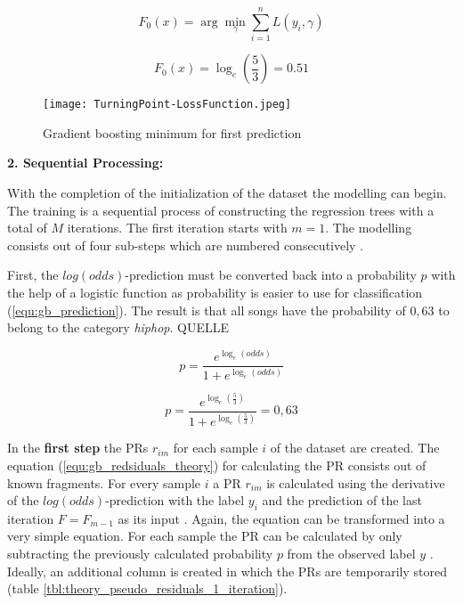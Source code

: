 \begin{equation}
    F_{0}(x) = \arg \min_{\gamma } \sum_{i= 1}^{n} L(y_{i}, \gamma)
    \label{equ:gb_initial_prediciton}
\end{equation}

\begin{equation*}
    F_{0}(x) = \log_{e}(\frac{5}{3}) = 0.51
\end{equation*}

\begin{figure}[H]
    \centering
    \caption[]{Gradient boosting minimum for first prediction}
	\label{fig:gb_turning_point-loss_function}
    \texttt{[image: TurningPoint-LossFunction.jpeg]}
\end{figure}

\textbf{2. Sequential Processing:}

With the completion of the initialization of the dataset the modelling can begin. The training is a sequential 
process of constructing the regression trees with a total of \(M\) iterations. The first iteration 
starts with \(m = 1\). The modelling consists out of four sub-steps which are numbered consecutively \cite[p.1198]{Friedman_2001}.

First, the \(log(odds)\)-prediction must be converted back into a probability \(p\) with the help of a 
logistic function as probability is easier to use for classification (\ref{equ:gb_prediction}). The result is 
that all songs have the probability of \(0,63\) to belong to the category \emph{hiphop}. QUELLE

\begin{equation}
    p = \frac{e^{\log_{e}(odds)}}{1 + e^{\log_{e}(odds)}} 
    \label{equ:gb_prediction}
\end{equation}

\begin{equation*}
    p = \frac{e^{\log_{e}(\frac{5}{3})}}{1 + e^{\log_{e}(\frac{5}{3})}} = 0,63
\end{equation*}

In the \textbf{first step} the \ac{PR}s \(r_{im}\) for each sample \(i\) of the dataset are created. The equation (\ref{equ:gb_redsiduals_theory}) 
for calculating the \ac{PR} consists out of known fragments. For every sample \(i\) a PR \(r_{im}\) 
is calculated using the derivative of the \(log(odds)\)-prediction with the label \(y_{i}\) and the 
prediction of the last iteration \(F = F_{m - 1}\) as its input \cite[p.361]{Hastie_2009}. Again, the equation can be 
transformed into a very simple equation. For each sample the \ac{PR} can be calculated by only 
subtracting the previously calculated probability \(p\) from the observed label \(y\) \cite{parr2022gb_explained_hrd} \cite{parr2022gb_explained_gbd}. Ideally, an additional 
column is created in which the PRs are temporarily stored (table \ref{tbl:theory_pseudo_residuals_1_iteration}). 

